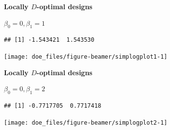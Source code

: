\documentclass[
  ignorenonframetext,
]{beamer}
\newenvironment{Shaded}{\begin{snugshade}}{\end{snugshade}}
\newcommand{\AttributeTok}[1]{\textcolor[rgb]{0.77,0.63,0.00}{#1}}
\newcommand{\DecValTok}[1]{\textcolor[rgb]{0.00,0.00,0.81}{#1}}
\newcommand{\FunctionTok}[1]{\textcolor[rgb]{0.00,0.00,0.00}{#1}}
\newcommand{\NormalTok}[1]{#1}
\newcommand{\OtherTok}[1]{\textcolor[rgb]{0.56,0.35,0.01}{#1}}
\newcommand{\SpecialCharTok}[1]{\textcolor[rgb]{0.00,0.00,0.00}{#1}}
\begin{document}
\begin{frame}[fragile]{}
\protect\hypertarget{section-24}{}
\textbf{Locally \(D\)-optimal designs}

\(\beta_0 = 0, \beta_1 = 1\)

\begin{Shaded}
\end{Shaded}

\begin{verbatim}
## [1] -1.543421  1.543530
\end{verbatim}

\begin{center}\texttt{[image: doe\_files/figure-beamer/simplogplot1-1]} \end{center}
\end{frame}

\begin{frame}[fragile]{}
\protect\hypertarget{section-25}{}
\textbf{Locally \(D\)-optimal designs}

\(\beta_0 = 0, \beta_1 = 2\)

\begin{Shaded}
\end{Shaded}

\begin{verbatim}
## [1] -0.7717705  0.7717418
\end{verbatim}

\begin{center}\texttt{[image: doe\_files/figure-beamer/simplogplot2-1]} \end{center}
\end{frame}
\end{document}
